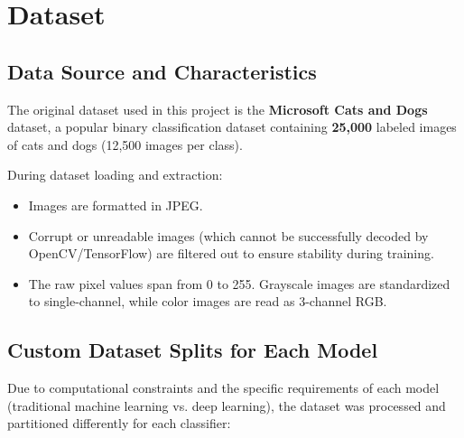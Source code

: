 \documentclass[12pt,a4paper]{article}
\begin{document}
\section{Dataset}

\subsection{Data Source and Characteristics}
The original dataset used in this project is the \textbf{Microsoft Cats and Dogs} dataset, a popular binary classification dataset containing \textbf{25,000} labeled images of cats and dogs (12,500 images per class).

During dataset loading and extraction:
\begin{itemize}
    \item Images are formatted in JPEG.
    \item Corrupt or unreadable images (which cannot be successfully decoded by OpenCV/TensorFlow) are filtered out to ensure stability during training.
    \item The raw pixel values span from 0 to 255. Grayscale images are standardized to single-channel, while color images are read as 3-channel RGB.
\end{itemize}

\subsection{Custom Dataset Splits for Each Model}
Due to computational constraints and the specific requirements of each model (traditional machine learning vs. deep learning), the dataset was processed and partitioned differently for each classifier:
\end{document}
